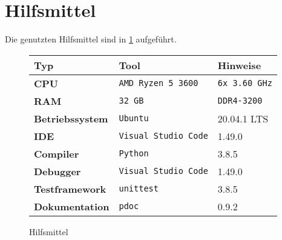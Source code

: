 \section{Hilfsmittel}
\label{sec:hilfsmittel}

Die genutzten Hilfsmittel sind in \ref{tab:tools} aufgeführt.

\begin{figure}[H]
    \centering
    \begin{tabular}{|l|l|l|}
        \hline
        \textbf{Typ}            & \textbf{Tool}               & \textbf{Hinweise}    \\
        \hline
        \hline
        \textbf{CPU}            & \texttt{AMD Ryzen 5 3600}   & \texttt{6x 3.60 GHz} \\
        \hline
        \textbf{RAM}            & \texttt{32 GB}              & \texttt{DDR4-3200}   \\
        \hline
        \hline
        \textbf{Betriebssystem} & \texttt{Ubuntu}             & 20.04.1 LTS          \\
        \hline
        \textbf{IDE}            & \texttt{Visual Studio Code} & 1.49.0               \\
        \hline
        \textbf{Compiler}       & \texttt{Python}             & 3.8.5                \\
        \hline
        \textbf{Debugger}       & \texttt{Visual Studio Code} & 1.49.0               \\
        \hline
        \textbf{Testframework}  & \texttt{unittest}           & 3.8.5                \\
        \hline
        \textbf{Dokumentation}  & \texttt{pdoc}               & 0.9.2                \\
        \hline
    \end{tabular}
    \caption{Hilfsmittel}
    \label{tab:tools}
\end{figure}